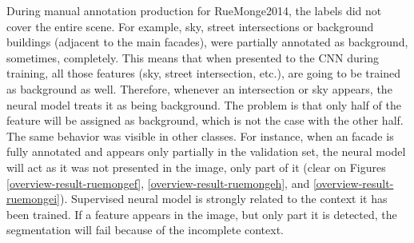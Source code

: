 During manual annotation production for RueMonge2014, the labels did not cover the entire scene. For example, sky, street intersections or background buildings (adjacent to the main facades), were partially annotated as background, sometimes, completely. This means that when presented to the CNN during training, all those features (sky, street intersection, etc.), are going to be trained as background as well. Therefore, whenever an intersection or sky appears, the neural model treats it as being background. The problem is that only half of the feature will be assigned as background, which is not the case with the other half. The same behavior was visible in other classes. For instance, when an facade is fully annotated and appears only partially in the validation set, the neural model will act as it was not presented in the image, only part of it (clear on Figures \ref{overview-result-ruemongef}, \ref{overview-result-ruemongeh}, and \ref{overview-result-ruemongei}). Supervised neural model is strongly related to the context it has been trained. If a feature appears in the image, but only part it is detected, the segmentation will fail because of the incomplete context.

